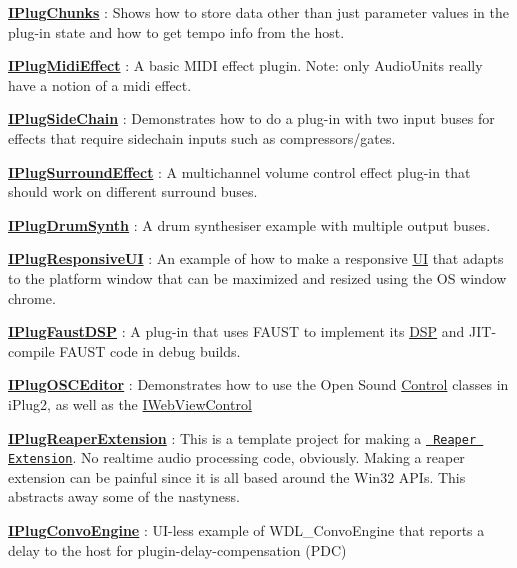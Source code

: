 \begin{DoxyItemize}
\item {\bfseries{\mbox{\hyperlink{class_i_plug_chunks}{I\+Plug\+Chunks}}}} \+: Shows how to store data other than just parameter values in the plug-\/in state and how to get tempo info from the host.
\item {\bfseries{\mbox{\hyperlink{class_i_plug_midi_effect}{I\+Plug\+Midi\+Effect}}}} \+: A basic M\+I\+DI effect plugin. Note\+: only Audio\+Units really have a notion of a midi effect.
\item {\bfseries{\mbox{\hyperlink{class_i_plug_side_chain}{I\+Plug\+Side\+Chain}}}} \+: Demonstrates how to do a plug-\/in with two input buses for effects that require sidechain inputs such as compressors/gates.
\item {\bfseries{\mbox{\hyperlink{class_i_plug_surround_effect}{I\+Plug\+Surround\+Effect}}}} \+: A multichannel volume control effect plug-\/in that should work on different surround buses.
\item {\bfseries{\mbox{\hyperlink{class_i_plug_drum_synth}{I\+Plug\+Drum\+Synth}}}} \+: A drum synthesiser example with multiple output buses.
\item {\bfseries{\mbox{\hyperlink{class_i_plug_responsive_u_i}{I\+Plug\+Responsive\+UI}}}} \+: An example of how to make a responsive \mbox{\hyperlink{class_u_i}{UI}} that adapts to the platform window that can be maximized and resized using the OS window chrome.
\item {\bfseries{\mbox{\hyperlink{class_i_plug_faust_d_s_p}{I\+Plug\+Faust\+D\+SP}}}} \+: A plug-\/in that uses F\+A\+U\+ST to implement its \mbox{\hyperlink{class_d_s_p}{D\+SP}} and J\+I\+T-\/compile F\+A\+U\+ST code in debug builds.
\item {\bfseries{\mbox{\hyperlink{class_i_plug_o_s_c_editor}{I\+Plug\+O\+S\+C\+Editor}}}} \+: Demonstrates how to use the Open Sound \mbox{\hyperlink{struct_control}{Control}} classes in i\+Plug2, as well as the \mbox{\hyperlink{class_i_web_view_control}{I\+Web\+View\+Control}}
\item {\bfseries{\mbox{\hyperlink{class_i_plug_reaper_extension}{I\+Plug\+Reaper\+Extension}}}} \+: This is a template project for making a \href{http://reaper.fm/sdk/plugin/plugin.php}{\texttt{ Reaper Extension}}. No realtime audio processing code, obviously. Making a reaper extension can be painful since it is all based around the Win32 A\+P\+Is. This abstracts away some of the nastyness.
\item {\bfseries{\mbox{\hyperlink{class_i_plug_convo_engine}{I\+Plug\+Convo\+Engine}}}} \+: U\+I-\/less example of W\+D\+L\+\_\+\+Convo\+Engine that reports a delay to the host for plugin-\/delay-\/compensation (P\+DC)

\end{DoxyItemize}
